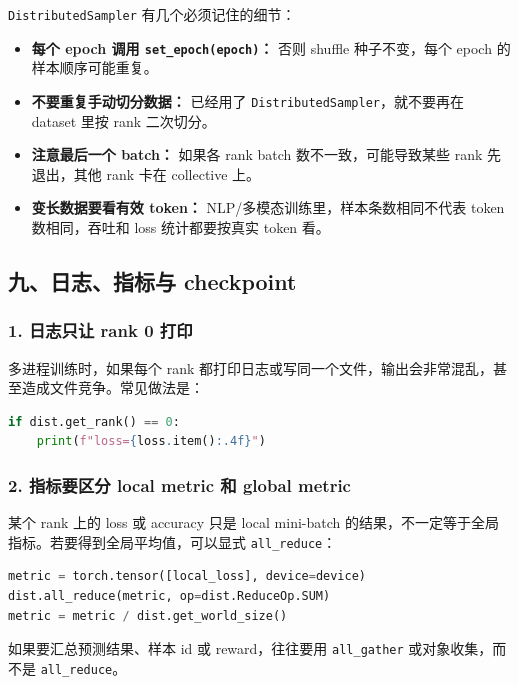 \texttt{DistributedSampler} 有几个必须记住的细节：

\begin{itemize}[leftmargin=1.5em]
  \item \textbf{每个 epoch 调用 \texttt{set\_epoch(epoch)}：} 否则 shuffle 种子不变，每个 epoch 的样本顺序可能重复。
  \item \textbf{不要重复手动切分数据：} 已经用了 \texttt{DistributedSampler}，就不要再在 dataset 里按 rank 二次切分。
  \item \textbf{注意最后一个 batch：} 如果各 rank batch 数不一致，可能导致某些 rank 先退出，其他 rank 卡在 collective 上。
  \item \textbf{变长数据要看有效 token：} NLP/多模态训练里，样本条数相同不代表 token 数相同，吞吐和 loss 统计都要按真实 token 看。
\end{itemize}

\subsection{九、日志、指标与 checkpoint}

\subsubsection*{1. 日志只让 rank 0 打印}

多进程训练时，如果每个 rank 都打印日志或写同一个文件，输出会非常混乱，甚至造成文件竞争。常见做法是：

\begin{lstlisting}[language=Python, caption=只在 rank 0 写日志]
if dist.get_rank() == 0:
    print(f"loss={loss.item():.4f}")
\end{lstlisting}

\subsubsection*{2. 指标要区分 local metric 和 global metric}

某个 rank 上的 loss 或 accuracy 只是 local mini-batch 的结果，不一定等于全局指标。若要得到全局平均值，可以显式 \texttt{all\_reduce}：

\begin{lstlisting}[language=Python, caption=跨 rank 平均一个标量指标]
metric = torch.tensor([local_loss], device=device)
dist.all_reduce(metric, op=dist.ReduceOp.SUM)
metric = metric / dist.get_world_size()
\end{lstlisting}

如果要汇总预测结果、样本 id 或 reward，往往要用 \texttt{all\_gather} 或对象收集，而不是 \texttt{all\_reduce}。

